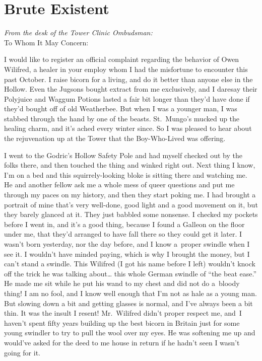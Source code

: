 \hypertarget{brute-existent}{%
\chapter{Brute Existent}\label{brute-existent}}

\emph{From the desk of the Tower Clinic Ombudsman:}\\

\noindent To Whom It May Concern:

I would like to register an official complaint regarding the behavior of
Owen Wilifred, a healer in your employ whom I had the misfortune to
encounter this past October. I raise bicorn for a living, and do it
better than anyone else in the Hollow. Even the Jugsons bought extract
from me exclusively, and I daresay their Polyjuice and Waggum Potions
lasted a fair bit longer than they'd have done if they'd bought off of
old Weatherbee. But when I was a younger man, I was stabbed through the
hand by one of the beasts. St.~Mungo's mucked up the healing charm, and
it's ached every winter since. So I was pleased to hear about the
rejuvenation up at the Tower that the Boy-Who-Lived was offering.

I went to the Godric's Hollow Safety Pole and had myself checked out by
the folks there, and then touched the thing and winked right out. Next
thing I know, I'm on a bed and this squirrely-looking bloke is sitting
there and watching me. He and another fellow ask me a whole mess of
queer questions and put me through my paces on my history, and then they
start poking me. I had brought a portrait of mine that's very well-done,
good light and a good movement on it, but they barely glanced at it.
They just babbled some nonsense. I checked my pockets before I went in,
and it's a good thing, because I found a Galleon on the floor under me,
that they'd arranged to have fall there so they could get it later. I
wasn't born yesterday, nor the day before, and I know a~proper swindle
when I see it. I wouldn't have minded paying, which is why I brought the
money, but I can't stand a swindle. This Wilifred (I got his name before
I left) wouldn't knock off the trick he was talking about\ldots{} this
whole German swindle of ``the beat ease.'' He made me sit while he put
his wand to my chest and did not do a~bloody thing! I am no fool, and I
know well enough that I'm not as hale as a young man. But slowing down a
bit and getting glasses is normal, and I've always been a bit thin. It
was the insult I resent! Mr.~Wilifred didn't proper respect me, and~I
haven't spent fifty years building up the best bicorn in Britain just
for some young swindler to try to pull the wool over my eyes. He was
softening me up and would've asked for the deed to me house in return if
he hadn't seen I wasn't going for it.

